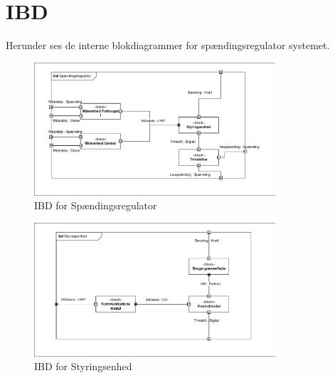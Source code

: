 

	 \section{IBD}
	 
	 Herunder ses de interne blokdiagrammer for spændingsregulator systemet. 
	 
	\begin{figure}[htbp] %
		\centering
		\includegraphics[width=0.8\textwidth]{figure/IBDSpaendingsregulator.pdf}
		\caption{IBD for Spændingsregulator}
		\label{fig:IBDSp}
	\end{figure}
	
	\begin{figure}[htbp] %
		\centering
		\includegraphics[width=0.8\textwidth]{figure/IBDStyringsenhed.pdf}
		\caption{IBD for Styringsenhed}
		\label{fig:IBDSt}
	\end{figure} 
	 




